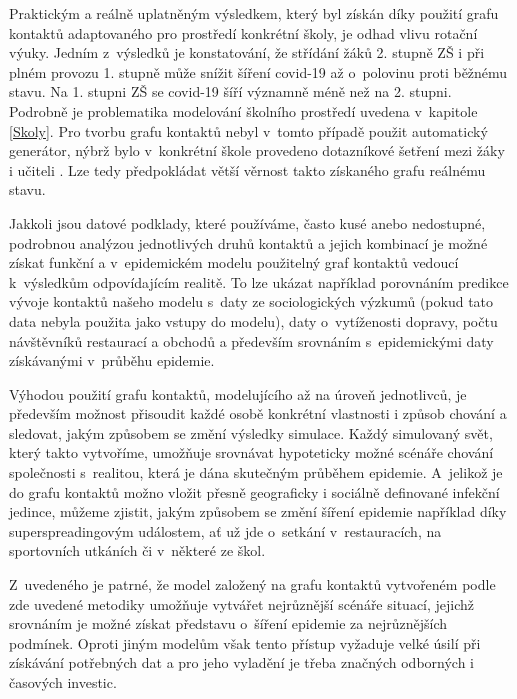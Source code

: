 Praktickým a reálně uplatněným výsledkem, který byl získán díky použití grafu kontaktů adaptovaného pro prostředí konkrétní školy, je odhad vlivu rotační výuky. Jedním z~výsledků je konstatování, že střídání žáků 2. stupně ZŠ i při plném provozu 1. stupně může snížit šíření covid-19 až o~polovinu proti běžnému stavu. Na 1. stupni ZŠ se covid-19 šíří významně méně než na 2. stupni. Podrobně je problematika modelování školního prostředí uvedena v~kapitole \ref{Skoly}. Pro tvorbu grafu kontaktů nebyl v~tomto případě použit automatický generátor, nýbrž bylo v~konkrétní škole provedeno dotazníkové šetření mezi žáky i učiteli \cite{BISOP-VZ-sireni-skoly}. Lze tedy předpokládat větší věrnost takto získaného grafu reálnému stavu.


Jakkoli jsou datové podklady, které používáme, často kusé anebo nedostupné, podrobnou analýzou jednotlivých druhů kontaktů a jejich kombinací je možné získat funkční a v~epidemickém modelu použitelný graf kontaktů vedoucí k~výsledkům odpovídajícím realitě. To lze ukázat například porovnáním predikce vývoje kontaktů našeho modelu s~daty ze sociologických výzkumů (pokud tato data nebyla použita jako vstupy do modelu), daty o~vytíženosti dopravy, počtu návštěvníků restaurací a obchodů a především srovnáním s~epidemickými daty získávanými v~průběhu epidemie. 

Výhodou použití grafu kontaktů, modelujícího až na úroveň jednotlivců, je pře\-de\-vším možnost přisoudit každé osobě konkrétní vlastnosti i způsob chování a sledovat, jakým způsobem se změní výsledky simulace. Každý simulovaný svět, který takto vytvoříme, umožňuje srovnávat hypoteticky možné scénáře chování společnosti s~realitou, která je dána skutečným průběhem epidemie. A~jelikož je do grafu kontaktů možno vložit přesně geograficky i sociálně definované infekční jedince, můžeme zjistit, jakým způsobem se změní šíření epidemie například díky superspreadingovým událostem, ať už jde o~setkání v~restauracích, na sportovních utkáních či v~některé ze škol. 

Z~uvedeného je patrné, že model založený na grafu kontaktů vytvořeném podle zde uvedené metodiky umožňuje vytvářet nejrůznější scénáře situací, jejichž srov\-ná\-ním je možné získat představu o~šíření epidemie za nejrůznějších podmínek. Oproti jiným modelům však tento přístup vyžaduje velké úsilí při získávání potřebných dat a pro jeho vyladění je třeba značných odborných i časových investic.



